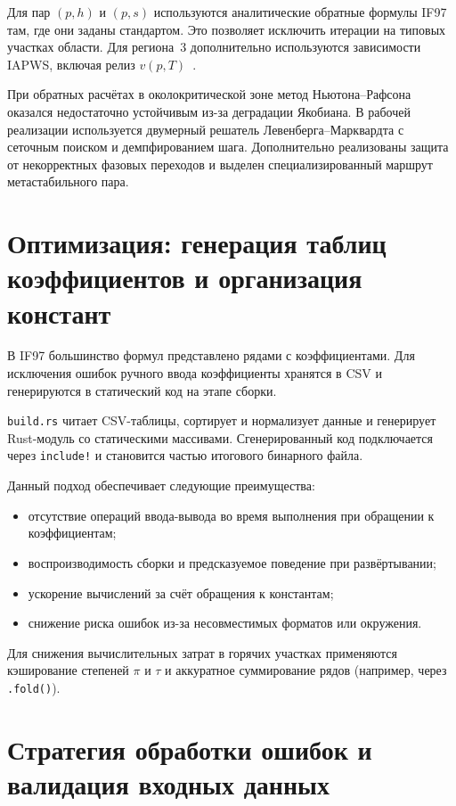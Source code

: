 Для пар $(p, h)$ и $(p, s)$
используются аналитические обратные формулы IF97 там,
где они заданы стандартом.
Это позволяет исключить итерации на типовых участках области.
Для региона~3 дополнительно используются зависимости IAPWS,
включая релиз $v(p, T)$~\cite{iapws_vpt_region3}.

При обратных расчётах в околокритической зоне
метод Ньютона--Рафсона оказался недостаточно устойчивым
из-за деградации Якобиана.
В рабочей реализации используется двумерный решатель
Левенберга--Марквардта с сеточным поиском
и демпфированием шага.
Дополнительно реализованы защита от некорректных фазовых переходов
и выделен специализированный маршрут метастабильного пара.

\section{Оптимизация: генерация таблиц коэффициентов и организация констант}

В IF97 большинство формул представлено рядами с коэффициентами.
Для исключения ошибок ручного ввода
коэффициенты хранятся в CSV и генерируются в статический код на этапе сборки.

\texttt{build.rs} читает CSV-таблицы,
сортирует и нормализует данные
и генерирует Rust-модуль со статическими массивами.
Сгенерированный код подключается через \texttt{include!}
и становится частью итогового бинарного файла.

Данный подход обеспечивает следующие преимущества:
\begin{itemize}
\item отсутствие операций ввода-вывода во время выполнения при обращении к коэффициентам;
\item воспроизводимость сборки и предсказуемое поведение при развёртывании;
\item ускорение вычислений за счёт обращения к константам;
\item снижение риска ошибок из-за несовместимых форматов или окружения.
\end{itemize}

Для снижения вычислительных затрат
в горячих участках применяются
кэширование степеней $\pi$ и $\tau$
и аккуратное суммирование рядов (например, через \texttt{.fold()}).

\section{Стратегия обработки ошибок и валидация входных данных}

